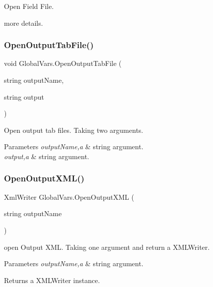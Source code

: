 Open Field File. 

more details. \mbox{\label{class_global_vars_a3d95bee07269860dc17a738aa02722f1}} 
\subsubsection{\texorpdfstring{OpenOutputTabFile()}{OpenOutputTabFile()}}
{\footnotesize\ttfamily void Global\+Vars.\+Open\+Output\+Tab\+File (\begin{DoxyParamCaption}\item[{string}]{output\+Name,  }\item[{string}]{output }\end{DoxyParamCaption})\hspace{0.3cm}{\ttfamily [inline]}}



Open output tab files. Taking two arguments. 


\begin{DoxyParams}{Parameters}
{\em output\+Name,a} & string argument. \\
\hline
{\em output,a} & string argument. \\
\hline
\end{DoxyParams}
\mbox{\label{class_global_vars_a7391bb9604228a9d2a281cb33f77961e}} 
\subsubsection{\texorpdfstring{OpenOutputXML()}{OpenOutputXML()}}
{\footnotesize\ttfamily Xml\+Writer Global\+Vars.\+Open\+Output\+X\+ML (\begin{DoxyParamCaption}\item[{string}]{output\+Name }\end{DoxyParamCaption})\hspace{0.3cm}{\ttfamily [inline]}}



open Output X\+ML. Taking one argument and return a X\+M\+L\+Writer. 


\begin{DoxyParams}{Parameters}
{\em output\+Name,a} & string argument. \\
\hline
\end{DoxyParams}
\begin{DoxyReturn}{Returns}
a X\+M\+L\+Writer instance. 
\end{DoxyReturn}
\mbox{\label{class_global_vars_ae0867ba6d6225f173f8394a20925cbdf}} 
